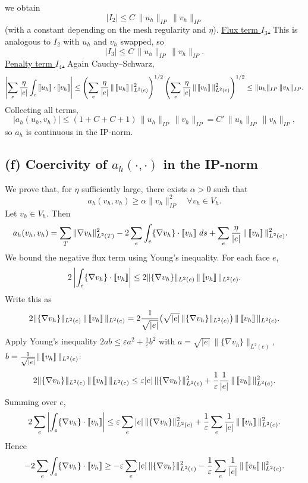 we obtain
\[
    |I_2| \le C\,\|u_h\|_{IP}\,\|v_h\|_{IP}
\]
(with a constant depending on the mesh regularity and $\eta$).
\underline{Flux term $I_3$.}
This is analogous to $I_2$ with $u_h$ and $v_h$ swapped, so
\[
    |I_3| \le C\,\|u_h\|_{IP}\,\|v_h\|_{IP}.
\]
\underline{Penalty term $I_4$.}
Again Cauchy--Schwarz,
\[
    \left|\sum_e \frac{\eta}{|e|} \int_e \jump{u_h}\cdot\jump{v_h}\right|
    \le \left(\sum_e \frac{\eta}{|e|}\,\|\jump{u_h}\|_{L^2(e)}^2\right)^{1/2}
    \left(\sum_e \frac{\eta}{|e|}\,\|\jump{v_h}\|_{L^2(e)}^2\right)^{1/2}
    \le \|u_h\|_{IP}\,\|v_h\|_{IP}.
\]
Collecting all terms,
\[
    |a_h(u_h,v_h)|
    \le (1+C+C+1)\,\|u_h\|_{IP}\,\|v_h\|_{IP}
    = C'\,\|u_h\|_{IP}\,\|v_h\|_{IP},
\]
so $a_h$ is continuous in the IP-norm.
\subsection*{(f) Coercivity of $a_h(\cdot,\cdot)$ in the IP-norm}
We prove that, for $\eta$ sufficiently large, there exists $\alpha>0$ such that
\[
    a_h(v_h,v_h) \ge \alpha \|v_h\|_{IP}^2 \quad\forall v_h\in V_h.
\]
Let $v_h\in V_h$. Then
\[
    \begin{aligned}
        a_h(v_h,v_h)
         & = \sum_T \|\nabla v_h\|_{L^2(T)}^2
        - 2\sum_e \int_e \{\nabla v_h\}\cdot\left[\!\left[ v_h \right]\!\right]\,ds
        + \sum_e \frac{\eta}{|e|}\,\|\left[\!\left[ v_h \right]\!\right]\|_{L^2(e)}^2.
    \end{aligned}
\]
We bound the negative flux term using Young's inequality.
For each face $e$,
\[
    2\left|\int_e \{\nabla v_h\}\cdot\left[\!\left[ v_h \right]\!\right]\right| \le 2\|\{\nabla v_h\}\|_{L^2(e)}\,\|\left[\!\left[ v_h \right]\!\right]\|_{L^2(e)}.
\]
Write this as
\[
    2\|\{\nabla v_h\}\|_{L^2(e)}\,\|\left[\!\left[ v_h \right]\!\right]\|_{L^2(e)} = 2\frac{1}{\sqrt{|e|}}\big(\sqrt{|e|}\,\|\{\nabla v_h\}\|_{L^2(e)}\big) \, \|\left[\!\left[ v_h \right]\!\right]\|_{L^2(e)}.
\]
Apply Young's inequality $2ab\le \varepsilon a^2 + \frac{1}{\varepsilon}b^2$ with
$a = \sqrt{|e|}\,\|\{\nabla v_h\}\|_{L^2(e)}$,
$b = \frac{1}{\sqrt{|e|}}\|\left[\!\left[ v_h \right]\!\right]\|_{L^2(e)}$:
\[
    2\|\{\nabla v_h\}\|_{L^2(e)}\,\|\left[\!\left[ v_h \right]\!\right]\|_{L^2(e)}
    \le \varepsilon |e|\,\|\{\nabla v_h\}\|_{L^2(e)}^2
    + \frac{1}{\varepsilon}\frac{1}{|e|}\,\|\left[\!\left[ v_h \right]\!\right]\|_{L^2(e)}^2.
\]
Summing over $e$,
\[
    2\sum_e \left|\int_e \{\nabla v_h\}\cdot\left[\!\left[ v_h \right]\!\right]\right|
    \le \varepsilon \sum_e |e|\,\|\{\nabla v_h\}\|_{L^2(e)}^2
    + \frac{1}{\varepsilon}\sum_e \frac{1}{|e|}\,\|\left[\!\left[ v_h \right]\!\right]\|_{L^2(e)}^2.
\]
Hence
\[
    - 2\sum_e \int_e \{\nabla v_h\}\cdot\left[\!\left[ v_h \right]\!\right]
    \ge -\varepsilon \sum_e |e|\,\|\{\nabla v_h\}\|_{L^2(e)}^2
    - \frac{1}{\varepsilon}\sum_e \frac{1}{|e|}\,\|\left[\!\left[ v_h \right]\!\right]\|_{L^2(e)}^2.
\]
